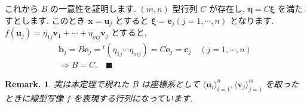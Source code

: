 \documentclass[openany, a4paper, oneside]{jsbook}
\theoremstyle{break}
\theoremstyle{breakdefn}
\newtheorem{rem}[thm]{Remark.}
\begin{document}
これから $B$ の一意性を証明します.
 $(m,n)$ 型行列 $C$ が存在し,  $\bm{\eta} = C \bm{\xi}$ を満たすとします.
このとき $\bm{x} = \bm{u}_j$ とすると $\bm{\xi} = \bm{e}_j ( j = 1,\dotsb, n)$ となります.
 $f (\bm{u}_j) = \eta_{1j} \bm{v}_1 +  \dotsb + \eta_{m j} \bm{v}_j$ とすると,
    \begin{gather}
        \bm{b}_j
        =
        B \bm{e}_j
        =
        {^t} ( \eta_{1j} \dotsb \eta_{m j} )
        =
        C \bm{e}_j
        =
        \bm{c}_j
        \quad
        (j = 1, \dotsb ,n)\\
        \Rightarrow
        B=C . \quad \blacksquare
    \end{gather}

\begin{rem}
実は本定理で現れた $B$ は座標系として $\langle \bm{u}_i \rangle _{i=1}^n,\langle \bm{v}_j \rangle _{j=1}^m$
を取ったときに線型写像 $f$ を表現する行列になっています.
\end{rem}
\end{document}
